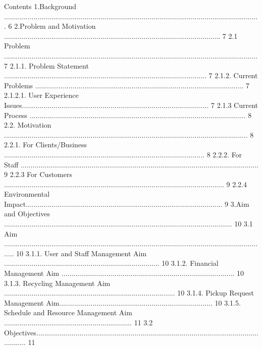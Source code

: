 \documentclass{article}
\begin{document}
Contents 
1.Background .................................................................................................................................. 6 
2.Problem and Motivation .............................................................................................................. 7 
2.1 Problem ................................................................................................................................. 7 
2.1.1. Problem Statement ....................................................................................................... 7 
2.1.2. Current Problems .......................................................................................................... 7 
2.1.2.1. User Experience Issues............................................................................................... 7 
2.1.3 Current Process .............................................................................................................. 8 
2.2. Motivation ............................................................................................................................ 8 
2.2.1. For Clients/Business ...................................................................................................... 8 
2.2.2. For Staff ......................................................................................................................... 9 
2.2.3 For Customers ................................................................................................................ 9 
2.2.4 Environmental Impact.................................................................................................... 9 
3.Aim and Objectives .................................................................................................................... 10 
3.1 Aim ...................................................................................................................................... 10 
3.1.1. User and Staff Management Aim ............................................................................... 10 
3.1.2. Financial Management Aim ........................................................................................ 10 
3.1.3. Recycling Management Aim ....................................................................................... 10 
3.1.4. Pickup Request Management Aim.............................................................................. 10 
3.1.5. Schedule and Resource Management Aim ................................................................. 11 
3.2 Objectives............................................................................................................................ 11 
\end{document}
